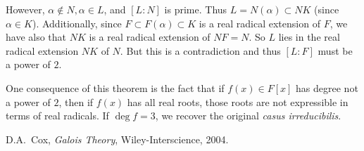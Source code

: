 \documentclass[12pt]{article}
\begin{document}
However, $\alpha\notin N, \alpha\in L$, and $[L:N]$ is prime. Thus $L=N(\alpha)\subset NK$ (since $\alpha\in K$). Additionally, since $F\subset F(\alpha)\subset K$ is a real radical extension of $F$, we have also that $NK$ is a real radical extension of $NF=N$. So $L$ lies in the real radical extension $NK$ of $N$. But this is a contradiction and thus $[L:F]$ must be a power of $2$.

One consequence of this theorem is the fact that if $f(x)\in F[x]$ has degree not a power of $2$, then if $f(x)$ has all real roots, those roots are not expressible in terms of real radicals. If $\deg f=3$, we recover the original \emph{casus irreducibilis}.

\begin{thebibliography}{10}
D.A.~Cox, \emph{Galois Theory}, Wiley-Interscience, 2004.
\end{thebibliography}
\end{document}
